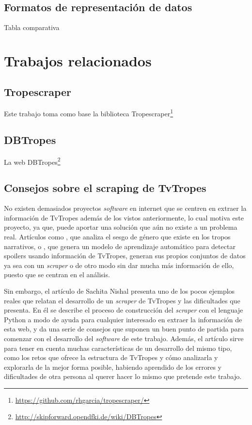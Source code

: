 \subsection{Formatos de representación de datos}
Tabla comparativa
\section{Trabajos relacionados}
\subsection{Tropescraper}
Este trabajo toma como base la biblioteca
Tropescraper\footnote{\url{https://github.com/rhgarcia/tropescraper/}}
\cite{garcia2020startroper}

\subsection{DBTropes}
La web DBTropes\footnote{\url{http://skipforward.opendfki.de/wiki/DBTropes}}
\cite{kiesel2010dbtropes}

\subsection{Consejos sobre el scraping de TvTropes}
No existen demasiados proyectos \textit{software} en internet que se centren en
extraer la información de TvTropes además de los vistos anteriormente, lo cual
motiva este proyecto, ya que, puede aportar una solución que aún no existe a un
problema real. Artículos como \cite{gala2020analyzing}, que analiza el sesgo de
género que existe en los tropos narrativos, o \cite{boyd2013spoiler}, que genera
un modelo de aprendizaje automático para detectar spoilers usando información de
TvTropes, generan sus propios conjuntos de datos ya sea con un \textit{scraper}
o de otro modo sin dar mucha más información de ello, puesto que se centran en
el análisis. 

Sin embargo, el artículo de Sachita Nishal \cite{nishalscraping} presenta uno de
los pocos ejemplos reales que relatan el desarrollo de un \textit{scraper} de
TvTropes y las dificultades que presenta. En él se describe el proceso de
construcción del \textit{scraper} con el lenguaje Python a modo de ayuda para
cualquier interesado en extraer la información de esta web, y da una serie de
consejos que suponen un buen punto de partida para comenzar con el desarrollo
del \textit{software} de este trabajo. Además, el artículo sirve para tener en
cuenta muchas características de un desarrollo del mismo tipo, como los retos
que ofrece la estructura de TvTropes y cómo analizarla y explorarla de la mejor
forma posible, habiendo aprendido de los errores y dificultades de otra persona
al querer hacer lo mismo que pretende este trabajo.

